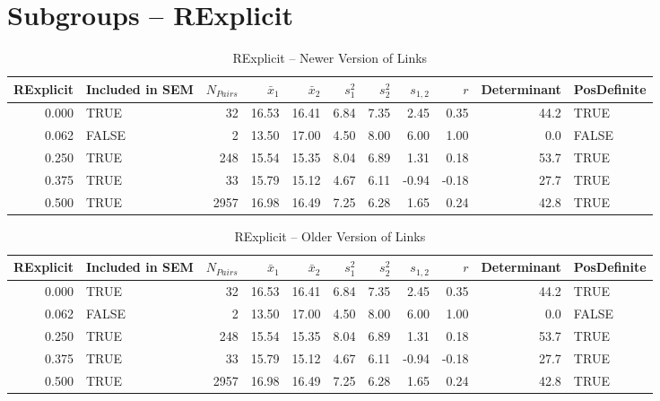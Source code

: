\documentclass{article}\usepackage[]{graphicx}\usepackage[]{color}
\begin{document}
\section{Subgroups --  RExplicit }%
\begin{table}[ht]
\centering
\begin{tabular}{rlrrrrrrrrl}
  \hline
RExplicit & Included in SEM & $N_{Pairs}$ & $\bar{x}_1$ & $\bar{x}_2$ & $s_1^2$ & $s_2^2$ & $s_{1,2}$ & $r$ & Determinant & PosDefinite \\ 
  \hline
0.000 & TRUE & 32 & 16.53 & 16.41 & 6.84 & 7.35 & 2.45 & 0.35 & 44.2 & TRUE \\ 
  0.062 & FALSE & 2 & 13.50 & 17.00 & 4.50 & 8.00 & 6.00 & 1.00 & 0.0 & FALSE \\ 
  0.250 & TRUE & 248 & 15.54 & 15.35 & 8.04 & 6.89 & 1.31 & 0.18 & 53.7 & TRUE \\ 
  0.375 & TRUE & 33 & 15.79 & 15.12 & 4.67 & 6.11 & -0.94 & -0.18 & 27.7 & TRUE \\ 
  0.500 & TRUE & 2957 & 16.98 & 16.49 & 7.25 & 6.28 & 1.65 & 0.24 & 42.8 & TRUE \\ 
   \hline
\end{tabular}
\caption{RExplicit -- Newer Version of Links} 
\end{table}
\begin{table}[ht]
\centering
\begin{tabular}{rlrrrrrrrrl}
  \hline
RExplicit & Included in SEM & $N_{Pairs}$ & $\bar{x}_1$ & $\bar{x}_2$ & $s_1^2$ & $s_2^2$ & $s_{1,2}$ & $r$ & Determinant & PosDefinite \\ 
  \hline
0.000 & TRUE & 32 & 16.53 & 16.41 & 6.84 & 7.35 & 2.45 & 0.35 & 44.2 & TRUE \\ 
  0.062 & FALSE & 2 & 13.50 & 17.00 & 4.50 & 8.00 & 6.00 & 1.00 & 0.0 & FALSE \\ 
  0.250 & TRUE & 248 & 15.54 & 15.35 & 8.04 & 6.89 & 1.31 & 0.18 & 53.7 & TRUE \\ 
  0.375 & TRUE & 33 & 15.79 & 15.12 & 4.67 & 6.11 & -0.94 & -0.18 & 27.7 & TRUE \\ 
  0.500 & TRUE & 2957 & 16.98 & 16.49 & 7.25 & 6.28 & 1.65 & 0.24 & 42.8 & TRUE \\ 
   \hline
\end{tabular}
\caption{RExplicit -- Older Version of Links} 
\end{table}
\newpage 
\end{document}
